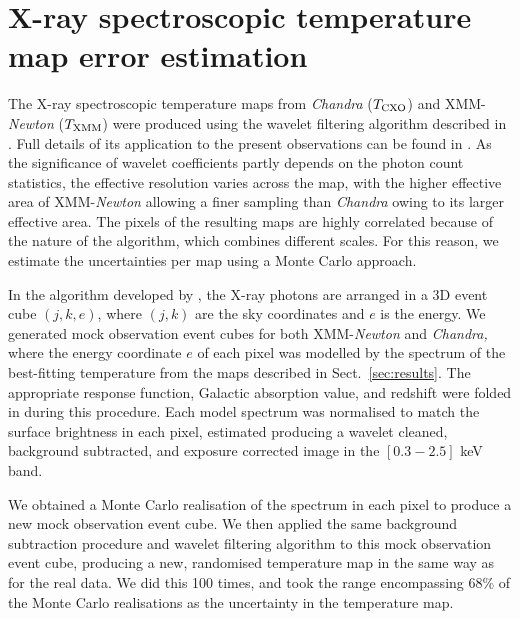 \documentclass[twocolumn,traditabstract]{aa}
\def \TXC {T_{\rm CXO}}
\def \TXX {T_{\rm XMM}}
\begin{document}
\section{X-ray spectroscopic temperature map error estimation}\label{append:Txerror}
The X-ray spectroscopic temperature maps from \textit{Chandra} ($\TXC$) and XMM-\textit{Newton} ($\TXX$) were produced using the wavelet filtering algorithm described in \cite{Bourdin2008}. Full details of its application to the present observations can be found in \cite{Adam2016b}. As the significance of wavelet coefficients partly depends on the photon count statistics, the effective resolution varies across the map, with the higher effective area of XMM-\textit{Newton} allowing a finer sampling than \textit{Chandra} owing to its larger effective area. The pixels of the resulting maps are highly correlated because of the nature of the algorithm, which combines different scales. For this reason, we estimate the uncertainties per map using a Monte Carlo approach.

In the algorithm developed by \citet{Bourdin2008}, the X-ray photons are arranged in a 3D event cube $(j,k,e)$, where $(j,k)$ are the sky coordinates and $e$ is the energy. We generated mock observation event cubes for both XMM-{\it Newton} and {\it Chandra,} where the energy coordinate $e$ of each pixel was modelled by the spectrum of the best-fitting temperature from the maps described in Sect.~\ref{sec:results}. The appropriate response function, Galactic absorption value, and redshift were folded in during this procedure. Each model spectrum was normalised to match the surface brightness in each pixel, estimated producing a wavelet cleaned, background subtracted, and exposure corrected image in the $[0.3-2.5]$ keV band.

We obtained a Monte Carlo realisation of the spectrum in each pixel to produce a new mock observation event cube. We then applied the same background subtraction procedure and wavelet filtering algorithm to this mock observation event cube, producing a new, randomised temperature map in the same way as for the real data. We did this 100 times, and took the range encompassing 68\% of the Monte Carlo realisations as the uncertainty in the temperature map.

\end{document}
